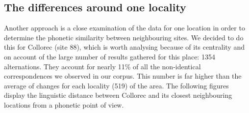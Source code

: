 \documentclass[output=paper]{LSP/langsci}
\begin{document}
\subsection[The differences around one locality]{The differences around one locality}

Another approach is a close examination of the data for one location in order to determine the phonetic similarity between neighbouring sites. We decided to do this for Collorec (site 88), which is worth analysing because of its centrality and on account of the large number of results gathered for this place: 1354 alternations. They account for nearly 11\% of all the non-identical correspondences we observed in our corpus. This number is far higher than the average of changes for each locality (519) of the area. The following figures display the linguistic distance between Collorec and its closest neighbouring locations from a phonetic point of view.

\begin{table}
\caption{Number of differences to neighbouring sites around Collorec (site 88)}
\label{tab:8}
\end{table}
\end{document}
